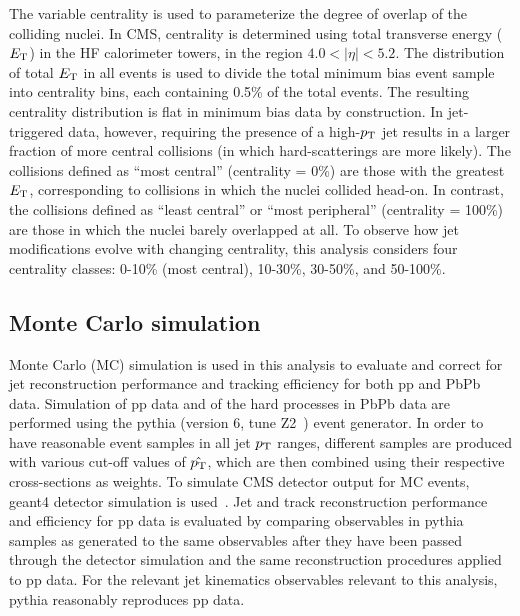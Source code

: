 The variable centrality is used to parameterize the degree of overlap of the colliding nuclei.  In CMS, centrality is determined using total transverse energy ($E_{\rm T}$) in the HF calorimeter towers, in the region $4.0 < |\eta| < 5.2$.  The distribution of total $E_{\rm T}$ in all events is used to divide the total minimum bias event sample into centrality bins, each containing 0.5\% of the total events.  The resulting centrality distribution is flat in minimum bias data by construction.  In jet-triggered data, however, requiring the presence of a high-$p_{\rm T}$ jet results in a larger fraction of more central collisions (in which hard-scatterings are more likely).  The collisions defined as ``most central'' (centrality = 0\%) are those with the greatest $E_{\rm T}$, corresponding to collisions in which the nuclei collided head-on.  In contrast, the collisions defined as ``least central'' or ``most peripheral'' (centrality = 100\%) are those in which the nuclei barely overlapped at all.  To observe how jet modifications evolve with changing centrality, this analysis considers four centrality classes:  0-10\% (most central), 10-30\%, 30-50\%, and 50-100\%.

\subsection{Monte Carlo simulation}

Monte Carlo (MC) simulation is used in this analysis to evaluate and correct for jet reconstruction performance and tracking efficiency for both pp and PbPb data.  Simulation of pp data and of the hard processes in PbPb data are performed using the {\sc pythia} (version 6, tune Z2~\cite{bib_pythia}) event generator. In order to have reasonable event samples in all jet $p_{\rm T}$ ranges, different samples are produced with various cut-off values of $\hat{p_{\rm T}}$, which are then combined using their respective cross-sections as weights.  To simulate CMS detector output for MC events, {\sc geant}4 detector simulation is used~\cite{bib_geant}.  Jet and track reconstruction performance and efficiency for pp data is evaluated by comparing observables in {\sc pythia} samples as generated to the same observables after they have been passed through the detector simulation and the same reconstruction procedures applied to pp data.  For the relevant jet kinematics observables relevant to this analysis, {\sc pythia} reasonably reproduces pp data.  

